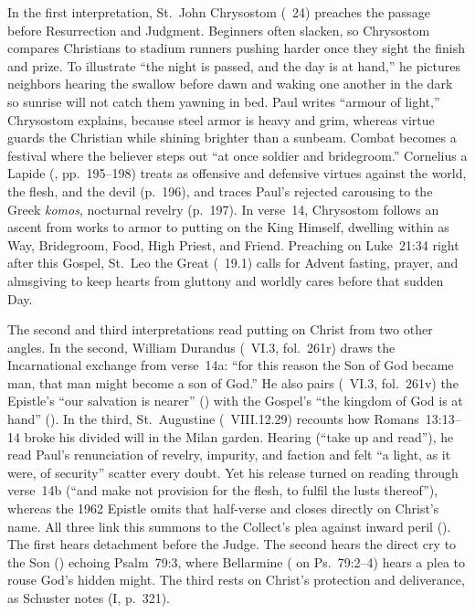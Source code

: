 In the first interpretation, St.~John Chrysostom (~24) preaches the passage before Resurrection and Judgment. Beginners often slacken, so Chrysostom compares Christians to stadium runners pushing harder once they sight the finish and prize. To illustrate ``the night is passed, and the day is at hand,'' he pictures neighbors hearing the swallow before dawn and waking one another in the dark so sunrise will not catch them yawning in bed. Paul writes ``armour of light,'' Chrysostom explains, because steel armor is heavy and grim, whereas virtue guards the Christian while shining brighter than a sunbeam. Combat becomes a festival where the believer steps out ``at once soldier and bridegroom.'' Cornelius a Lapide (, pp.~195--198) treats  as offensive and defensive virtues against the world, the flesh, and the devil (p.~196), and traces Paul's rejected carousing to the Greek \emph{komos}, nocturnal revelry (p.~197). In verse~14, Chrysostom follows an ascent from works to armor to putting on the King Himself, dwelling within as Way, Bridegroom, Food, High Priest, and Friend. Preaching on Luke~21:34 right after this Gospel, St.~Leo the Great (~19.1) calls for Advent fasting, prayer, and almsgiving to keep hearts from gluttony and worldly cares before that sudden Day.

The second and third interpretations read putting on Christ from two other angles. In the second, William Durandus (~VI.3, fol.~261r) draws the Incarnational exchange from verse~14a: ``for this reason the Son of God became man, that man might become a son of God.'' He also pairs (~VI.3, fol.~261v) the Epistle's ``our salvation is nearer'' () with the Gospel's ``the kingdom of God is at hand'' (). In the third, St.~Augustine (~VIII.12.29) recounts how Romans~13:13--14 broke his divided will in the Milan garden. Hearing  (``take up and read''), he read Paul's renunciation of revelry, impurity, and faction and felt ``a light, as it were, of security'' scatter every doubt. Yet his release turned on reading through verse~14b (``and make not provision for the flesh, to fulfil the lusts thereof''), whereas the 1962 Epistle omits that half-verse and closes directly on Christ's name. All three link this summons to the Collect's plea against inward peril (). The first hears detachment before the Judge. The second hears the direct cry to the Son () echoing Psalm~79:3, where Bellarmine ( on Ps.~79:2--4) hears a plea to rouse God's hidden might. The third rests on Christ's protection and deliverance, as Schuster notes (I, p.~321).

